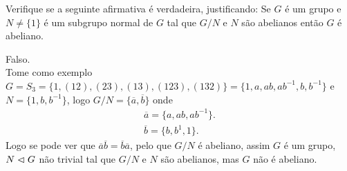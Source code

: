 \begin{homeworkProblem}
  Verifique se a seguinte afirmativa é verdadeira, justificando: Se $G$ é um grupo e $N \neq \{1\}$ é um subgrupo normal de $G$ tal que $G/N$ e $N$ são abelianos então $G$ é abeliano.
  \begin{solution}
    Falso.\\
    Tome como exemplo $G=S_3=\{1,(12),(23),(13),(123),(132)\}=\{1,a,ab,ab^{-1},b,b^{-1}\}$ e $N=\{1,b,b^{-1}\}$, logo $G/N=\{\overline{a},\overline{b}\}$ onde
    \begin{align*}
      \overline{a}=\{a,ab,ab^{-1}\}.\\
      \overline{b}=\{b,b^{1},1\}.
    \end{align*}
    Logo se pode ver que $\overline{a}\overline{b}=\overline{b}\overline{a}$, pelo que $G/N$ é abeliano, assim $G$ é um grupo, $N\vartriangleleft G$ não trivial tal que $G/N$ e $N$ são abelianos, mas $G$ não é abeliano. 
  \end{solution}
\end{homeworkProblem}
